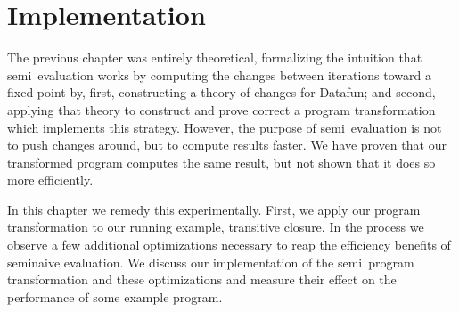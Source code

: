 \chapter{Implementation}

\newcommand\deep{\mathvar{dp}}

The previous chapter was entirely theoretical, formalizing the intuition that
semi\naive\ evaluation works by computing the changes between iterations toward
a fixed point by, first, constructing a theory of changes for Datafun; and
second, applying that theory to construct and prove correct a program
transformation which implements this strategy. However, the purpose of
semi\naive\ evaluation is not to push changes around, but to compute results
faster. We have proven that our transformed program computes the same result,
but not shown that it does so more efficiently.

In this chapter we remedy this experimentally. First, we apply our program
transformation to our running example, transitive closure. In the process we
observe a few additional optimizations necessary to reap the efficiency
benefits of seminaive evaluation. We discuss our implementation of the
semi\naive\ program transformation and these optimizations and measure their
effect on the performance of some example program.



